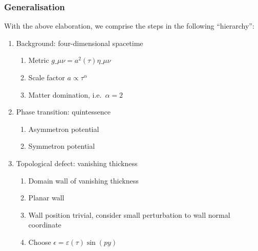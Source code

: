 
\subsubsection{Generalisation}
With the above elaboration, we comprise the steps in the following ``hierarchy'':
\begin{enumerate}
    \item\label{item:whatif:framework:bckg} Background: four-dimensional spacetime %
    \begin{enumerate}
        \item Metric $g\_{\mu\nu}= a^2(\tau)\eta\_{\mu\nu}$ 
        \item\label{item:whatif:framework:bckg_simple_scale_factor} Scale factor $a\propto \tau^\alpha$
        \item\label{item:whatif:framework:bckg_matter_dom} Matter domination, i.e.~$\alpha=2$
    \end{enumerate}
    \item\label{item:whatif:framework:pt}  Phase transition: quintessence %
        \begin{enumerate}
            \item\label{item:whatif:framework:pt_asymmetron} Asymmetron potential
            \item\label{item:whatif:framework:pt_symmetron}  Symmetron potential
        \end{enumerate}
    \item\label{item:whatif:framework:defect} Topological defect: vanishing thickness %
        \begin{enumerate}
            \item\label{item:whatif:framework:defect_dw} Domain wall of vanishing thickness 
            \item\label{item:whatif:framework:defect_planar} Planar wall
            \item\label{item:whatif:framework:defect_pert} Wall position trivial, consider small perturbation to wall normal coordinate
            \item\label{item:whatif:framework:defect_simple_pert} Choose $\epsilon=\varepsilon(\tau)\sin(py)$
        \end{enumerate}
\end{enumerate}


